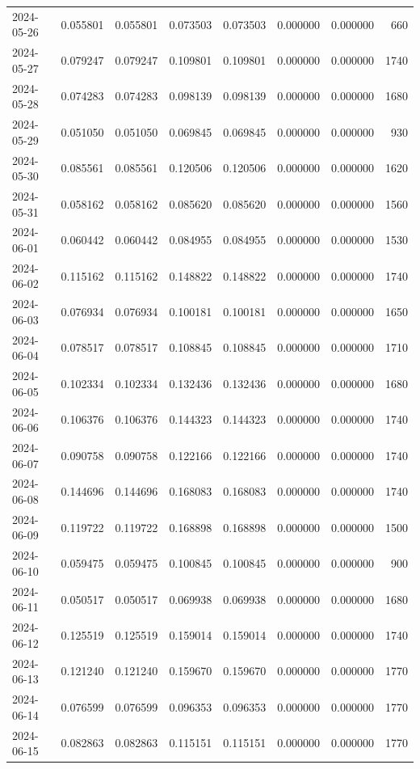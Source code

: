 \begin{tabular}{lrrrrrrr}
2024-05-26 & 0.055801 & 0.055801 & 0.073503 & 0.073503 & 0.000000 & 0.000000 & 660 \\
2024-05-27 & 0.079247 & 0.079247 & 0.109801 & 0.109801 & 0.000000 & 0.000000 & 1740 \\
2024-05-28 & 0.074283 & 0.074283 & 0.098139 & 0.098139 & 0.000000 & 0.000000 & 1680 \\
2024-05-29 & 0.051050 & 0.051050 & 0.069845 & 0.069845 & 0.000000 & 0.000000 & 930 \\
2024-05-30 & 0.085561 & 0.085561 & 0.120506 & 0.120506 & 0.000000 & 0.000000 & 1620 \\
2024-05-31 & 0.058162 & 0.058162 & 0.085620 & 0.085620 & 0.000000 & 0.000000 & 1560 \\
2024-06-01 & 0.060442 & 0.060442 & 0.084955 & 0.084955 & 0.000000 & 0.000000 & 1530 \\
2024-06-02 & 0.115162 & 0.115162 & 0.148822 & 0.148822 & 0.000000 & 0.000000 & 1740 \\
2024-06-03 & 0.076934 & 0.076934 & 0.100181 & 0.100181 & 0.000000 & 0.000000 & 1650 \\
2024-06-04 & 0.078517 & 0.078517 & 0.108845 & 0.108845 & 0.000000 & 0.000000 & 1710 \\
2024-06-05 & 0.102334 & 0.102334 & 0.132436 & 0.132436 & 0.000000 & 0.000000 & 1680 \\
2024-06-06 & 0.106376 & 0.106376 & 0.144323 & 0.144323 & 0.000000 & 0.000000 & 1740 \\
2024-06-07 & 0.090758 & 0.090758 & 0.122166 & 0.122166 & 0.000000 & 0.000000 & 1740 \\
2024-06-08 & 0.144696 & 0.144696 & 0.168083 & 0.168083 & 0.000000 & 0.000000 & 1740 \\
2024-06-09 & 0.119722 & 0.119722 & 0.168898 & 0.168898 & 0.000000 & 0.000000 & 1500 \\
2024-06-10 & 0.059475 & 0.059475 & 0.100845 & 0.100845 & 0.000000 & 0.000000 & 900 \\
2024-06-11 & 0.050517 & 0.050517 & 0.069938 & 0.069938 & 0.000000 & 0.000000 & 1680 \\
2024-06-12 & 0.125519 & 0.125519 & 0.159014 & 0.159014 & 0.000000 & 0.000000 & 1740 \\
2024-06-13 & 0.121240 & 0.121240 & 0.159670 & 0.159670 & 0.000000 & 0.000000 & 1770 \\
2024-06-14 & 0.076599 & 0.076599 & 0.096353 & 0.096353 & 0.000000 & 0.000000 & 1770 \\
2024-06-15 & 0.082863 & 0.082863 & 0.115151 & 0.115151 & 0.000000 & 0.000000 & 1770 \\

\end{tabular}
